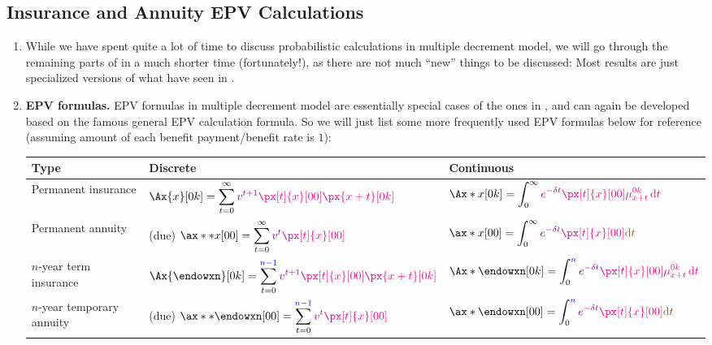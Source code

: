 \subsection{Insurance and Annuity EPV Calculations}
\begin{enumerate}
\item While we have spent quite a lot of time to discuss probabilistic
calculations in multiple decrement model, we will go through the remaining
parts of  in a much shorter time (fortunately!), as
there are not much ``new'' things to be discussed: Most results are just
specialized versions of what have seen in .

\item \textbf{EPV formulas.} EPV formulas in multiple decrement model are
essentially special cases of the ones in ,
and can again be developed based on the famous general EPV calculation
formula. So we will just list some more frequently used EPV formulas below for
reference (assuming amount of each benefit payment/benefit rate is \(1\)):
\begin{center}
\begin{tabular}{lll}
\toprule
Type&Discrete&Continuous \\
\midrule
Permanent insurance&
\(\displaystyle \Ax{x}[0k]=\sum_{t=0}^{\infty}\vc{v^{t+1}}\mgc{\px[t]{x}[00]\px{x+t}[0k]}\)
&\(\displaystyle \Ax*{x}[0k]=\int_{0}^{\infty}\vc{e^{-\delta t}}\mgc{\px[t]{x}[00]\mu_{x+t}^{0k}\dd{t}}\) \\
Permanent annuity&
(due) \(\displaystyle \ax**{x}[00]=\sum_{t=0}^{\infty}\vc{v^{t}}\mgc{\px[t]{x}[00]} \)
& \(\displaystyle \ax*{x}[00]=\int_{0}^{\infty}\vc{e^{-\delta t}}\mgc{\px[t]{x}[00]}\brc{\dd{t}} \)
\\
\(n\)-year term insurance&
\(\displaystyle \Ax{\endowxn}[0k]=\sum_{t=0}^{\blc{n-1}}\vc{v^{t+1}}\mgc{\px[t]{x}[00]\px{x+t}[0k]}\)
&\(\displaystyle \Ax*{\endowxn}[0k]=\int_{0}^{\blc{n}}\vc{e^{-\delta t}}\mgc{\px[t]{x}[00]\mu_{x+t}^{0k}\dd{t}}\) \\
\(n\)-year temporary annuity&
(due) \(\displaystyle \ax**{\endowxn}[00]=\sum_{t=0}^{\blc{n-1}}\vc{v^{t}}\mgc{\px[t]{x}[00]}\)
& \(\displaystyle \ax*{\endowxn}[00]=\int_{0}^{\blc{n}}\vc{e^{-\delta t}}\mgc{\px[t]{x}[00]}\brc{\dd{t}} \)
\\
\bottomrule
\end{tabular}
\end{center}
\end{enumerate}
